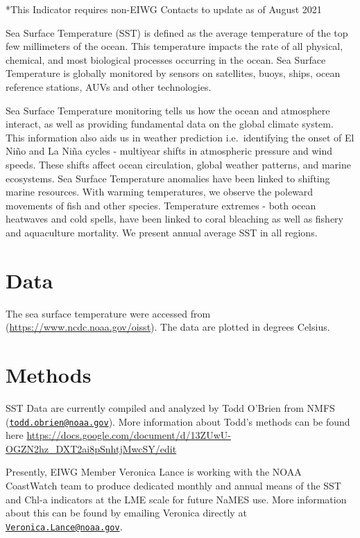 \documentclass[
]{book}
\begin{document}
*This Indicator requires non-EIWG Contacts to update as of August 2021

Sea Surface Temperature (SST) is defined as the average temperature of the top few millimeters of the ocean. This temperature impacts the rate of all physical, chemical, and most biological processes occurring in the ocean. Sea Surface Temperature is globally monitored by sensors on satellites, buoys, ships, ocean reference stations, AUVs and other technologies.

Sea Surface Temperature monitoring tells us how the ocean and atmosphere interact, as well as providing fundamental data on the global climate system. This information also aids us in weather prediction i.e.~identifying the onset of El Niño and La Niña cycles - multiyear shifts in atmospheric pressure and wind speeds. These shifts affect ocean circulation, global weather patterns, and marine ecosystems. Sea Surface Temperature anomalies have been linked to shifting marine resources. With warming temperatures, we observe the poleward movements of fish and other species. Temperature extremes - both ocean heatwaves and cold spells, have been linked to coral bleaching as well as fishery and aquaculture mortality. We present annual average SST in all regions.

\hypertarget{data-8}{%
\section{Data}\label{data-8}}

The sea surface temperature were accessed from (\url{https://www.ncdc.noaa.gov/oisst}). The data are plotted in degrees Celsius.

\hypertarget{methods-8}{%
\section{Methods}\label{methods-8}}

SST Data are currently compiled and analyzed by Todd O'Brien from NMFS (\href{mailto:todd.obrien@noaa.gov}{\nolinkurl{todd.obrien@noaa.gov}}). More information about Todd's methods can be found here \url{https://docs.google.com/document/d/13ZUwU-OGZN2hz_DXT2ai8pSnhtjMwcSY/edit}

Presently, EIWG Member Veronica Lance is working with the NOAA CoastWatch team to produce dedicated monthly and annual means of the SST and Chl-a indicators at the LME scale for future NaMES use. More information about this can be found by emailing Veronica directly at \href{mailto:Veronica.Lance@noaa.gov}{\nolinkurl{Veronica.Lance@noaa.gov}}.
\end{document}
